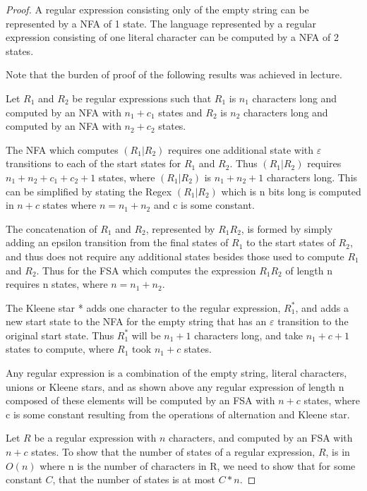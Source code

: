 \documentclass[11pt]{article}
\begin{document}
\begin{proof}
A regular expression consisting only of the empty string can be represented by a NFA of 1 state. The language represented by a regular expression consisting of one literal character can be computed by a NFA of 2 states.

Note that the burden of proof of the following results was achieved in lecture.

Let $R_{1}$ and $R_{2}$ be regular expressions such that $R_{1}$ is $n_{1}$ characters long and computed by an NFA with $n_{1} + c_{1}$ states and $R_{2}$ is $n_{2}$ characters long and computed by an NFA with $n_{2} + c_{2}$ states.

The NFA which computes $(R_{1}|R_{2})$ requires one additional state with $\varepsilon$ transitions to each of the start states for $R_{1}$ and $R_{2}$. Thus $(R_{1}|R_{2})$ requires $n_{1} + n_{2} + c_{1} + c_{2} + 1$ states, where $(R_{1}|R_{2})$ is $n_{1} + n_{2} + 1$ characters long. This can be simplified by stating the Regex $(R_{1}|R_{2})$ which is n bits long is computed in $n + c$ states where $n = n_{1} + n_{2}$ and c is some constant.

The concatenation of $R_{1}$ and $R_{2}$, represented by $R_{1}R_{2}$, is formed by simply adding an epsilon transition from the final states of $R_{1}$ to the start states of $R_{2}$, and thus does not require any additional states besides those used to compute $R_{1}$ and $R_{2}$. Thus for the FSA which computes the expression $R_{1}R_{2}$ of length n requires n states, where $n = n_{1} + n_{2}$.

The Kleene star * adds one character to the regular expression, $R_{1}^*$, and adds a new start state to the NFA for the empty string that has an $\varepsilon$ transition to the original start state. Thus $R_{1}^*$ will be $n_{1} + 1$ characters long, and take $n_{1} + c + 1$ states to compute, where $R_{1}$ took $n_{1} + c$ states.

Any regular expression is a combination of the empty string, literal characters, unions or Kleene stars, and as shown above any regular expression of length n composed of these elements will be computed by an FSA with $n + c$ states, where c is some constant resulting from the operations of alternation and Kleene star.

Let $R$ be a regular expression with $n$ characters, and computed by an FSA with $n+c$ states.
To show that the number of states of a regular expression, $R$, is in $O(n)$ where n is the number of characters in R, we need to show that for some constant $C$, that the number of states is at most $C*n$.


\end{proof}
\end{document}
